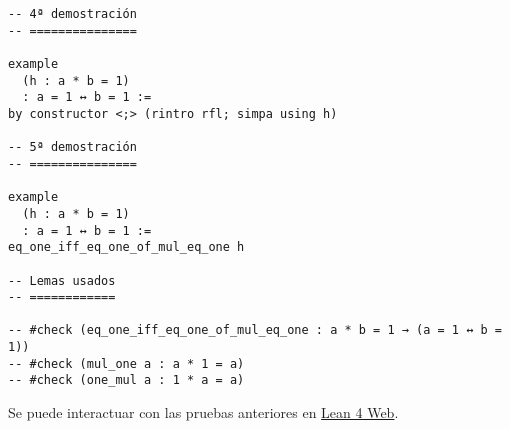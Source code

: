\begin{verbatim}
-- 4ª demostración
-- ===============

example
  (h : a * b = 1)
  : a = 1 ↔ b = 1 :=
by constructor <;> (rintro rfl; simpa using h)

-- 5ª demostración
-- ===============

example
  (h : a * b = 1)
  : a = 1 ↔ b = 1 :=
eq_one_iff_eq_one_of_mul_eq_one h

-- Lemas usados
-- ============

-- #check (eq_one_iff_eq_one_of_mul_eq_one : a * b = 1 → (a = 1 ↔ b = 1))
-- #check (mul_one a : a * 1 = a)
-- #check (one_mul a : 1 * a = a)
\end{verbatim}
Se puede interactuar con las pruebas anteriores en \href{https://lean.math.hhu.de/\#url=https://raw.githubusercontent.com/jaalonso/Calculemus2/main/src/Equivalencia\_de\_inversos\_iguales\_al\_neutro.lean}{Lean 4 Web}.

